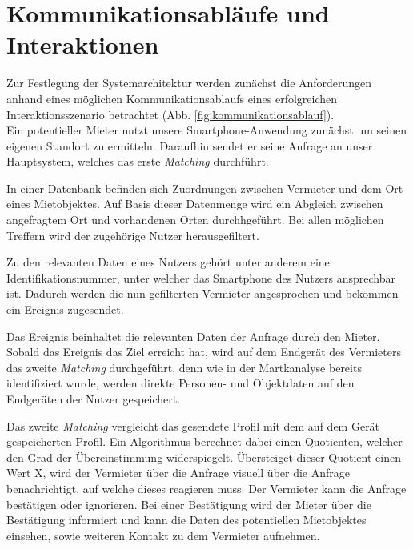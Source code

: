 
\section{Kommunikationsabläufe und Interaktionen}

Zur Festlegung der Systemarchitektur werden zunächst die Anforderungen anhand eines möglichen Kommunikationsablaufs eines erfolgreichen Interaktionsszenario betrachtet (Abb. \ref{fig:kommunikationsablauf}).\\

Ein potentieller Mieter nutzt unsere Smartphone-Anwendung zunächst um seinen eigenen Standort zu ermitteln. Daraufhin sendet er seine Anfrage an unser Hauptsystem, welches das erste \textit{Matching} durchführt.

In einer Datenbank befinden sich Zuordnungen zwischen Vermieter und dem Ort eines Mietobjektes. Auf Basis dieser Datenmenge wird ein Abgleich zwischen angefragtem Ort und vorhandenen Orten durchhgeführt. Bei allen möglichen Treffern wird der zugehörige Nutzer herausgefiltert.

Zu den relevanten Daten eines Nutzers gehört unter anderem eine Identifikationsnummer, unter welcher das Smartphone des Nutzers ansprechbar ist.
Dadurch werden die nun gefilterten Vermieter angesprochen und bekommen ein Ereignis zugesendet.

Das Ereignis beinhaltet die relevanten Daten der Anfrage durch den Mieter. Sobald das Ereignis das Ziel erreicht hat, wird auf dem Endgerät des Vermieters das zweite \textit{Matching} durchgeführt, denn wie in der Martkanalyse bereits identifiziert wurde, werden direkte Personen- und Objektdaten auf den Endgeräten der Nutzer gespeichert.

Das zweite \textit{Matching} vergleicht das gesendete Profil mit dem auf dem Gerät gespeicherten Profil. Ein Algorithmus berechnet dabei einen Quotienten, welcher den Grad der Übereinstimmung widerspiegelt. Übersteiget dieser Quotient einen Wert X, wird der Vermieter über die Anfrage visuell über die Anfrage benachrichtigt, auf welche dieses reagieren muss.
Der Vermieter kann die Anfrage bestätigen oder ignorieren. Bei einer Bestätigung wird der Mieter über die Bestätigung informiert und kann die Daten des potentiellen Mietobjektes einsehen, sowie weiteren Kontakt zu dem Vermieter aufnehmen.

